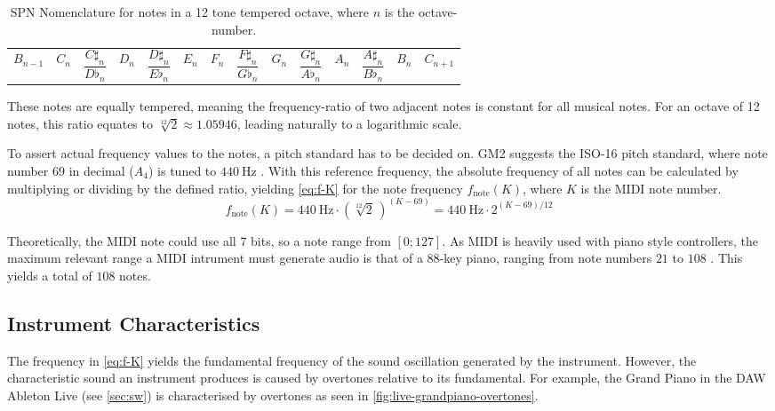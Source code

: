 \begin{table}[h]
	\centering
	\caption{\acs{SPN} Nomenclature for notes in a 12 tone tempered octave, where $n$ is the octave-number.}\label{tab:octave}
	\begin{tabular}{c|cccccccccccc|c}
		\color{gray} $B_{n-1}$ & $C_n$ & $\dfrac{C\sharp_n}{D\flat_n}$ & $D_n$ & $\dfrac{D\sharp_n}{E\flat_n}$ & $E_n$ & $F_n$ & $\dfrac{F\sharp_n}{G\flat_n}$ & $G_n$ & $\dfrac{G\sharp_n}{A\flat_n}$ & $A_n$ & $\dfrac{A\sharp_n}{B\flat_n}$ & $B_n$ & \color{gray} $C_{n+1}$
	\end{tabular}
\end{table}

These notes are equally tempered, meaning the frequency-ratio of two adjacent notes is constant for all musical notes. For an octave of 12 notes, this ratio equates to $\!\!\sqrt[12]{2}\approx 1.05946$, leading naturally to a logarithmic scale.

To assert actual frequency values to the notes, a pitch standard has to be decided on. \acs{GM2} suggests the ISO-16 pitch standard, where note number $69$ in decimal ($A_4$) is tuned to $\SI{440}{\hertz}$ \cite[sec.~2.7.1.1]{gm2_specification_online}. With this reference frequency, the absolute frequency of all notes can be calculated by multiplying or dividing by the defined ratio, yielding \autoref{eq:f-K} for the note frequency $f_{\text{note}}(K)$, where $K$ is the MIDI note number.
\begin{equation}
	f_{\text{note}}(K) = \SI{440}{\hertz} \cdot (\!\!\sqrt[12]{2}\,)^{(K-69)} = \SI{440}{\hertz} \cdot 2^{(K-69)/12}\label{eq:f-K}
\end{equation}

Theoretically, the MIDI note could use all 7 bits, so a note range from $[0;127]$. As MIDI is heavily used with piano style controllers, the maximum relevant range a \acs{MIDI} intrument must generate audio is that of a 88-key piano, ranging from note numbers $21$ to $108$ \cite[p.~10]{m1_detailed_specification_online}\cite[p.~25]{gm2_specification_online}. This yields a total of $108$ notes.

\subsection{Instrument Characteristics}

The frequency in \autoref{eq:f-K} yields the fundamental frequency of the sound oscillation generated by the instrument. However, the characteristic sound an instrument produces is caused by overtones relative to its fundamental. For example, the Grand Piano \cite{live_grandpiano} in the \ac{DAW} Ableton Live (see \autoref{sec:sw}) is characterised by overtones as seen in \autoref{fig:live-grandpiano-overtones}.

